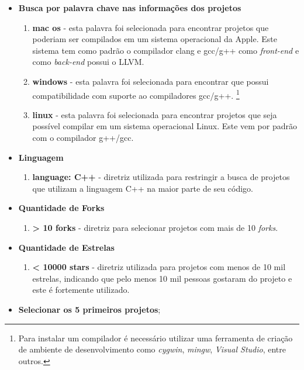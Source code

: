 \begin{itemize}
    \item \textbf{Busca por palavra chave nas informações dos projetos}
        \begin{enumerate}[label=\roman* )]
        \item \textbf{mac os} - esta palavra foi selecionada para encontrar projetos
 que poderiam ser compilados em um sistema operacional da Apple. Este sistema tem
 como padrão o compilador clang e gcc/g++ como \textit{front-end}  e como \textit{back-end} possui o LLVM.
        \item \textbf{windows} - esta palavra foi selecionada para encontrar 
 que possui compatibilidade com suporte ao compiladores gcc/g++.
\footnote{Para instalar um compilador é necessário utilizar uma ferramenta de criação de ambiente de desenvolvimento como \textit{cygwin}, \textit{mingw}, \textit{Visual Studio}, entre outros.}
        \item \textbf{linux} - esta palavra foi selecionada para encontrar projetos
 que seja possível compilar em um sistema operacional Linux. Este vem por padrão com
 o compilador g++/gcc.
        \end{enumerate}
    \item \textbf{Linguagem}
        \begin{enumerate}[label=\roman* )]
            \item \textbf{language: C++} - diretriz utilizada para restringir a busca de 
projetos que utilizam a linguagem C++ na maior parte de seu código.
        \end{enumerate}
    \item \textbf{Quantidade de Forks}
        \begin{enumerate}[label=\roman* )]
            \item \textbf{ > 10 forks} - diretriz para selecionar projetos com
 mais de 10 \textit{forks}.
        \end{enumerate}
    \item \textbf{Quantidade de Estrelas}
        \begin{enumerate}[label=\roman* )]
            \item \textbf{ < 10000 stars } - diretriz utilizada para projetos com menos
 de 10 mil estrelas, indicando que pelo menos 10 mil pessoas gostaram do projeto e este
é fortemente utilizado. 
        \end{enumerate}
	\item \textbf{Selecionar os 5 primeiros projetos};
\end{itemize}


